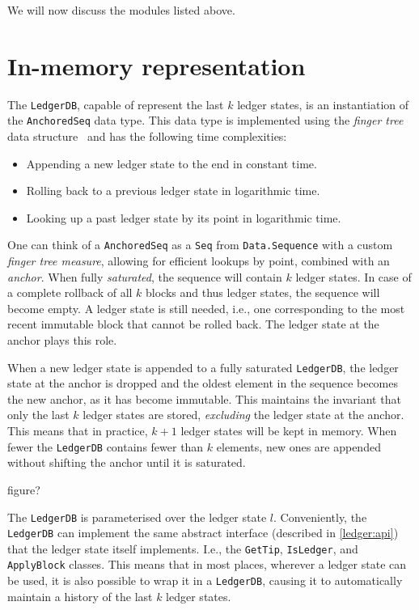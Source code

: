 We will now discuss the modules listed above.

\section{In-memory representation}
\label{ledgerdb:in-memory}

The \lstinline!LedgerDB!, capable of represent the last $k$ ledger states, is an
instantiation of the \lstinline!AnchoredSeq! data type. This data type is
implemented using the \emph{finger tree} data structure~\cite{fingertrees} and
has the following time complexities:

\begin{itemize}
\item Appending a new ledger state to the end in constant time.
\item Rolling back to a previous ledger state in logarithmic time.
\item Looking up a past ledger state by its point in logarithmic time.
\end{itemize}

One can think of a \lstinline!AnchoredSeq! as a \lstinline!Seq! from
\lstinline!Data.Sequence! with a custom \emph{finger tree measure}, allowing for
efficient lookups by point, combined with an \emph{anchor}. When fully
\emph{saturated}, the sequence will contain $k$ ledger states. In case of a
complete rollback of all $k$ blocks and thus ledger states, the sequence will
become empty. A ledger state is still needed, i.e., one corresponding to the
most recent immutable block that cannot be rolled back. The ledger state at the
anchor plays this role.

When a new ledger state is appended to a fully saturated \lstinline!LedgerDB!,
the ledger state at the anchor is dropped and the oldest element in the sequence
becomes the new anchor, as it has become immutable. This maintains the invariant
that only the last $k$ ledger states are stored, \emph{excluding} the ledger
state at the anchor. This means that in practice, $k + 1$ ledger states will be
kept in memory. When fewer the \lstinline!LedgerDB! contains fewer than $k$
elements, new ones are appended without shifting the anchor until it is
saturated.

 figure?

The \lstinline!LedgerDB! is parameterised over the ledger state $l$.
Conveniently, the \lstinline!LedgerDB! can implement the same abstract interface
(described in \cref{ledger:api}) that the ledger state itself implements. I.e.,
the \lstinline!GetTip!, \lstinline!IsLedger!, and \lstinline!ApplyBlock!
classes. This means that in most places, wherever a ledger state can be used, it
is also possible to wrap it in a \lstinline!LedgerDB!, causing it to
automatically maintain a history of the last $k$ ledger states.


